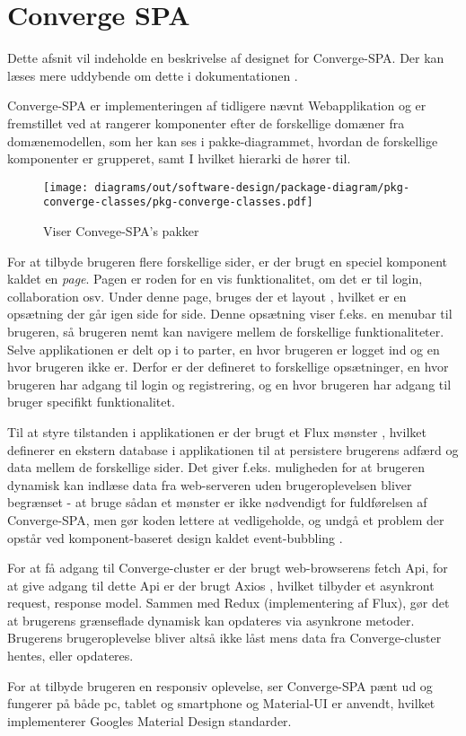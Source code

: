 \section{Converge SPA}

Dette afsnit vil indeholde en beskrivelse af designet for Converge-SPA. Der kan læses mere uddybende om dette i dokumentationen \cite[Converge-SPA]{software-design}.

Converge-SPA er implementeringen af tidligere nævnt Webapplikation og er fremstillet ved at rangerer komponenter efter de forskellige domæner fra domænemodellen, som her kan ses i pakke-diagrammet, hvordan de forskellige komponenter er grupperet, samt I hvilket hierarki de hører til.


\begin{figure}[H]
    \centering
\texttt{[image: diagrams/out/software-design/package-diagram/pkg-converge-classes/pkg-converge-classes.pdf]}
\caption{Viser Convege-SPA's pakker}
\label{fig:packagediagram}
\end{figure}

For at tilbyde brugeren flere forskellige sider, er der brugt en speciel komponent kaldet en \emph{page}. Pagen er roden for en vis 
funktionalitet, om det er til login, collaboration osv. Under denne page, bruges der et layout \cite[Layout]{converge-terms}, hvilket er en opsætning der går igen side for side. Denne opsætning viser f.eks. en menubar til brugeren, så brugeren nemt kan navigere mellem de forskellige funktionaliteter. Selve applikationen er delt op i to parter, en hvor brugeren er logget ind og en hvor brugeren ikke er. Derfor er der defineret to forskellige opsætninger, en hvor brugeren har adgang til login og registrering, og en hvor brugeren har adgang til bruger specifikt funktionalitet.

Til at styre tilstanden i applikationen er der brugt et Flux mønster \cite{Flux-pattern}, hvilket definerer en ekstern database i applikationen til at persistere brugerens adfærd og data mellem de forskellige sider. Det giver f.eks. muligheden for at brugeren dynamisk kan indlæse data fra web-serveren uden brugeroplevelsen bliver begrænset - at bruge sådan et mønster er ikke nødvendigt for fuldførelsen af Converge-SPA, men gør koden lettere at vedligeholde, og undgå et problem der opstår ved komponent-baseret design kaldet event-bubbling \cite[Event-bubbling]{converge-terms}.

For at få adgang til Converge-cluster er der brugt web-browserens fetch Api, for at give adgang til dette Api er der brugt Axios \cite{Axios}, hvilket tilbyder et asynkront request, response model. Sammen med Redux (implementering af Flux), gør det at brugerens grænseflade dynamisk kan opdateres via asynkrone metoder. Brugerens brugeroplevelse bliver altså ikke låst mens data fra Converge-cluster hentes, eller opdateres.

For at tilbyde brugeren en responsiv oplevelse, ser Converge-SPA pænt ud og fungerer på både pc, tablet og smartphone og Material-UI \cite[Material-UI]{converge-terms} er anvendt, hvilket implementerer Googles Material Design standarder.
